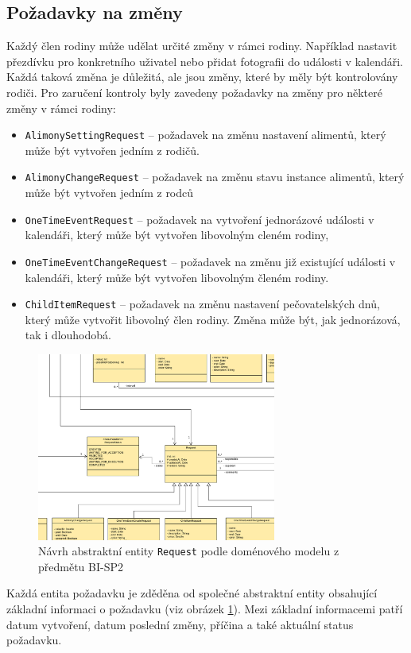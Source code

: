     \subsection{Požadavky na změny}
        Každý člen rodiny může udělat určité změny v rámci rodiny. Například nastavit přezdívku pro konkretního uživatel nebo přidat fotografii do události v kalendáři. Každá taková změna je důležitá, ale jsou změny, které by měly být kontrolovány rodiči. Pro zaručení kontroly byly zavedeny požadavky na změny pro některé změny v rámci rodiny:
        \begin{itemize}
            \item \texttt{AlimonySettingRequest} -- požadavek na změnu nastavení alimentů, který může být vytvořen jedním z rodičů.
            \item \texttt{AlimonyChangeRequest} -- požadavek na změnu stavu instance alimentů, který může být vytvořen jedním z rodců
            \item \texttt{OneTimeEventRequest} -- požadavek na vytvoření jednorázové události v kalendáři, který může být vytvořen libovolným cleném rodiny,
            \item \texttt{OneTimeEventChangeRequest} -- požadavek na změnu již existující události v kalendáři, který může být vytvořen libovolným členém rodiny.
            \item \texttt{ChildItemRequest} -- požadavek na změnu nastavení pečovatelských dnů, který může vytvořit libovolný člen rodiny. Změna může být, jak jednorázová, tak i dlouhodobá.
        \end{itemize}
        \begin{figure}\centering
	        \includegraphics[width=0.7\textwidth]{pdfs/Abstr-Requrest1}
	        \caption[Návrh abstraktní entity \texttt{Request}]{Návrh abstraktní entity \texttt{Request} podle doménového modelu z předmětu BI-SP2}\label{image:abstr-request1}
        \end{figure}
        Každá entita požadavku je zděděna od společné abstraktní entity obsahující základní informaci o požadavku (viz obrázek \ref{image:abstr-request1}). Mezi základní informacemi patří datum vytvoření, datum poslední změny, příčina a také aktuální status požadavku.
        
